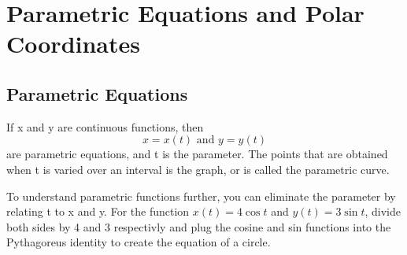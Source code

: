 \documentclass[../main.tex]{subfiles}
\begin{document}
\section{Parametric Equations and Polar Coordinates}

\subsection{Parametric Equations}

If x and y are continuous functions, then 
\[ x = x(t) \text{ and } y = y(t) \]
are parametric equations, and t is the parameter. The points that are obtained 
when t is varied over an interval is the graph, or is called the parametric curve.
\smallskip
\par To understand parametric functions further, you can eliminate the parameter by 
relating t to x and y. For the function $x(t) = 4\cos t$ and $y(t) = 3\sin t$, 
divide both sides by 4 and 3 respectivly and plug the cosine and sin functions into 
the Pythagoreus identity to create the equation of a circle.
\end{document}
